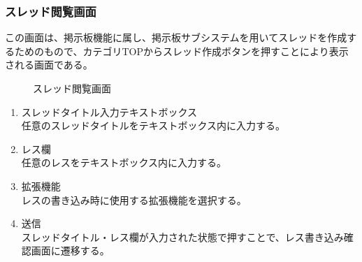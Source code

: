 \documentclass[a4j]{jarticle}
\begin{document}
\subsubsection{スレッド閲覧画面}
この画面は、掲示板機能に属し、掲示板サブシステムを用いてスレッドを作成するためのもので、カテゴリTOPからスレッド作成ボタンを押すことにより表示される画面である。\\
\begin{figure}[H]
\centering
{}
\caption{スレッド閲覧画面}
\label{fig:read_thread}
\end{figure}

\begin{enumerate}
  \renewcommand{\labelenumi}{\textcircled{\scriptsize \theenumi}}

\item スレッドタイトル入力テキストボックス\\
任意のスレッドタイトルをテキストボックス内に入力する。

\item レス欄\\
任意のレスをテキストボックス内に入力する。

\item 拡張機能\\
レスの書き込み時に使用する拡張機能を選択する。

\item 送信\\
スレッドタイトル・レス欄が入力された状態で押すことで、レス書き込み確認画面に遷移する。

\end{enumerate}
\end{document}
